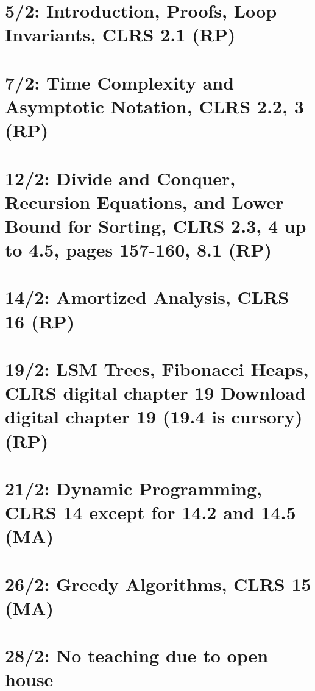 \documentclass[a4paper]{article}
\begin{document}
\maketitle


\tableofcontents

\clearpage

\setcounter{page}{1}


\section{5/2: Introduction, Proofs, Loop Invariants, CLRS 2.1 (RP)}
\section{7/2: Time Complexity and Asymptotic Notation, CLRS 2.2, 3 (RP)}
\section{12/2: Divide and Conquer, Recursion Equations, and Lower Bound for Sorting, CLRS 2.3, 4 up to 4.5, pages 157-160, 8.1 (RP)}
\section{14/2: Amortized Analysis, CLRS 16 (RP)}
\section{19/2: LSM Trees, Fibonacci Heaps, CLRS digital chapter 19
  Download digital chapter 19 (19.4 is cursory) (RP)}
\section{21/2: Dynamic Programming, CLRS 14 except for 14.2 and 14.5 (MA)}
\section{26/2: Greedy Algorithms, CLRS 15 (MA)}
\section{28/2: No teaching due to open house}
\end{document}
